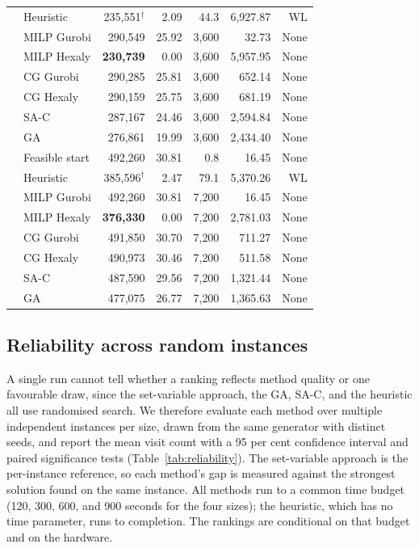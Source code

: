 \documentclass[]{interact}
\begin{document}
\begin{table}[t]
{\begin{tabular}{@{}llrrrrr@{}}
 & Heuristic & 235{,}551$^\dagger$ & 2.09 & 44.3 & 6{,}927.87 & WL \\
 & MILP Gurobi & 290{,}549 & 25.92 & 3{,}600 & 32.73 & None \\
 & MILP Hexaly & \textbf{230{,}739} & 0.00 & 3{,}600 & 5{,}957.95 & None \\
 & CG Gurobi & 290{,}285 & 25.81 & 3{,}600 & 652.14 & None \\
 & CG Hexaly & 290{,}159 & 25.75 & 3{,}600 & 681.19 & None \\
 & SA-C & 287{,}167 & 24.46 & 3{,}600 & 2{,}594.84 & None \\
 & GA & 276{,}861 & 19.99 & 3{,}600 & 2{,}434.40 & None \\
\midrule
{}
 & Feasible start & 492{,}260 & 30.81 & 0.8 & 16.45 & None \\
 & Heuristic & 385{,}596$^\dagger$ & 2.47 & 79.1 & 5{,}370.26 & WL \\
 & MILP Gurobi & 492{,}260 & 30.81 & 7{,}200 & 16.45 & None \\
 & MILP Hexaly & \textbf{376{,}330} & 0.00 & 7{,}200 & 2{,}781.03 & None \\
 & CG Gurobi & 491{,}850 & 30.70 & 7{,}200 & 711.27 & None \\
 & CG Hexaly & 490{,}973 & 30.46 & 7{,}200 & 511.58 & None \\
 & SA-C & 487{,}590 & 29.56 & 7{,}200 & 1{,}321.44 & None \\
 & GA & 477{,}075 & 26.77 & 7{,}200 & 1{,}365.63 & None \\
\bottomrule
\end{tabular}}
\label{tab:synthetic}
\end{table}

\subsection{Reliability across random instances}\label{sec:reliability}
A single run cannot tell whether a ranking reflects method quality or one favourable draw, since the set-variable approach, the GA, SA-C, and the heuristic all use randomised search. We therefore evaluate each method over multiple independent instances per size, drawn from the same generator with distinct seeds, and report the mean visit count with a 95 per cent confidence interval and paired significance tests (Table~\ref{tab:reliability}). The set-variable approach is the per-instance reference, so each method's gap is measured against the strongest solution found on the same instance. All methods run to a common time budget (120, 300, 600, and 900 seconds for the four sizes); the heuristic, which has no time parameter, runs to completion. The rankings are conditional on that budget and on the hardware.
\end{document}
